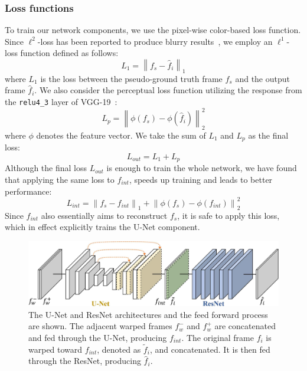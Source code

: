 \subsubsection{\textbf{Loss functions}}
To train our network components, we use the pixel-wise color-based loss function.
Since $\ell^2$-loss has been reported to produce blurry results~\cite{goroshin2015learning,mathieu2016deep,long2016learning}, we employ an $\ell^1$-loss function defined as follows:
\begin{equation}
\label{loss1}
L_1=\left\| f_s - \hat{f}_i \right\|_1
\end{equation}
where $L_1$ is the loss between the pseudo-ground truth frame $f_s$ and the output frame $\hat{f}_i$.
We also consider the perceptual loss function utilizing the response from the \texttt{relu4\_3} layer of VGG-19~\cite{simonyan2014very}:
\begin{equation}
\label{loss2p}
L_p=\left\| \phi{(f_s)} - \phi{(\hat{f}_i)} \right\|^2_2
\end{equation}
where $\phi$ denotes the feature vector.
We take the sum of $L_1$ and $L_p$ as the final loss:
\begin{equation}
\label{lossOut}
L_{out}=L_1+L_p
\end{equation}
Although the final loss $L_{out}$ is enough to train the whole network, we have found that 
applying the same loss to $f_{int}$, speeds up training and leads to better performance:
\begin{equation}
\label{lossInt}
L_{int}=\left\| f_s - f_{int} \right\|_1 + \left\| \phi{(f_s)} - \phi{(f_{int})} \right\|^2_2
\end{equation}
Since $f_{int}$ also essentially aims to reconstruct $f_s$, it is safe to apply this loss, which in effect explicitly trains the U-Net component.

\begin{figure}
	\includegraphics[width=1\linewidth,keepaspectratio]{network}
	\caption{The U-Net and ResNet architectures and the feed forward process are shown.
	The adjacent warped frames $f_w^-$ and $f_w^+$ are concatenated and fed through the U-Net, producing $f_{int}$.
	The original frame $f_i$ is warped toward $f_{int}$, denoted as $\tilde{f}_i$, and concatenated.
	It is then fed through the ResNet, producing $\hat{f}_i$.}
	\label{network}
\end{figure}

